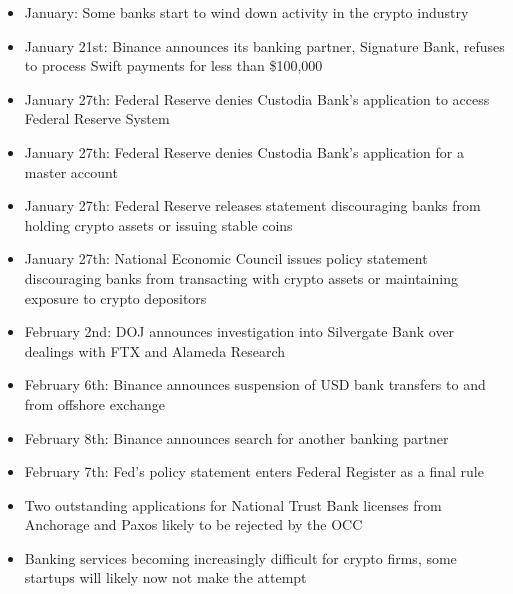 \begin{itemize}
\item January: Some banks start to wind down activity in the crypto industry
\item January 21st: Binance announces its banking partner, Signature Bank, refuses to process Swift payments for less than \$100,000
\item January 27th: Federal Reserve denies Custodia Bank's application to access Federal Reserve System
\item January 27th: Federal Reserve denies Custodia Bank's application for a master account
\item January 27th: Federal Reserve releases statement discouraging banks from holding crypto assets or issuing stable coins
\item January 27th: National Economic Council issues policy statement discouraging banks from transacting with crypto assets or maintaining exposure to crypto depositors
\item February 2nd: DOJ announces investigation into Silvergate Bank over dealings with FTX and Alameda Research
\item February 6th: Binance announces suspension of USD bank transfers to and from offshore exchange
\item February 8th: Binance announces search for another banking partner
\item February 7th: Fed's policy statement enters Federal Register as a final rule
\item Two outstanding applications for National Trust Bank licenses from Anchorage and Paxos likely to be rejected by the OCC
\item Banking services becoming increasingly difficult for crypto firms, some startups will likely now not make the attempt
\end{itemize}
